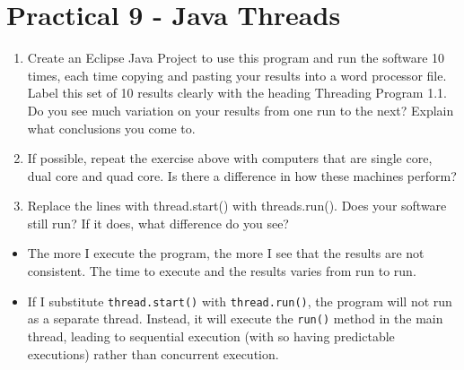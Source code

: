 \documentclass[a4paper]{article}
\begin{document}
\section{Practical 9 - Java Threads}

\textcolor{green!50!black}{
\begin{enumerate}
    \item Create an Eclipse Java Project to use this program and run the software 10 times, each time copying and pasting your results into a word processor file.   Label this set of 10 results clearly with the heading Threading Program 1.1.
    Do you see much variation on your results from one run to the next?  Explain what conclusions you come to.  
    \item If possible, repeat the exercise above with computers that are single core, dual
     core and quad core. Is there a difference in how these machines perform?
    \item Replace the lines with thread.start() with threads.run(). 
Does your software still run?
If it does, what difference do you see?
\end{enumerate}
}
\begin{itemize}
    \item The more I execute the program, the more I see that the results are not consistent. The time to execute and the results varies from run to run.
    \item If I substitute \texttt{thread.start()} with \texttt{thread.run()}, the program will not run as a separate thread. Instead, it will execute the \texttt{run()} method in the main thread, leading to sequential execution (with so having predictable executions) rather than concurrent execution.
\end{itemize}
\end{document}
